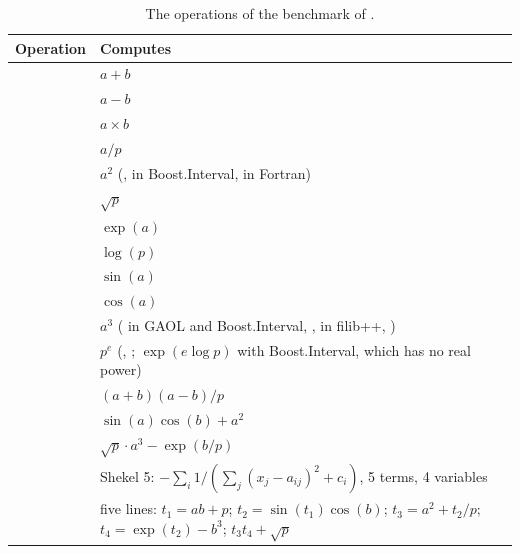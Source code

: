 \begin{table}[htbp]
\centering\footnotesize
\caption{The operations of the benchmark of .} \label{tab:computing-bench-ops}
\begin{tabular}{|l|L{10.5cm}|}
\hline
\textbf{Operation} & \textbf{Computes} \\
\hline
{} & $a + b$ \\
 & $a - b$ \\
 & $a \times b$ \\
 & $a / p$ \\
 & $a^2$ (,  in Boost.Interval,
 in Fortran) \\
 & $\sqrt{p}$ \\
 & $\exp(a)$ \\
 & $\log(p)$ \\
 & $\sin(a)$ \\
 & $\cos(a)$ \\
 & $a^3$ ( in GAOL and Boost.Interval,
,  in filib++, ) \\
 & $p^e$ (, ; $\exp(e \log p)$
with Boost.Interval, which has no real power) \\
 & $(a + b)(a - b) / p$ \\
 & $\sin(a) \cos(b) + a^2$ \\
 & $\sqrt{p} \cdot a^3 - \exp(b / p)$ \\
 & Shekel 5: $-\sum_i 1 / (\sum_j (x_j - a_{ij})^2 + c_i)$,
5 terms, 4 variables \\
 & five lines: $t_1 = ab + p$; $t_2 = \sin(t_1) \cos(b)$;
$t_3 = a^2 + t_2/p$; $t_4 = \exp(t_2) - b^3$; $t_3 t_4 + \sqrt{p}$ \\
\hline
\end{tabular}

\end{table}

